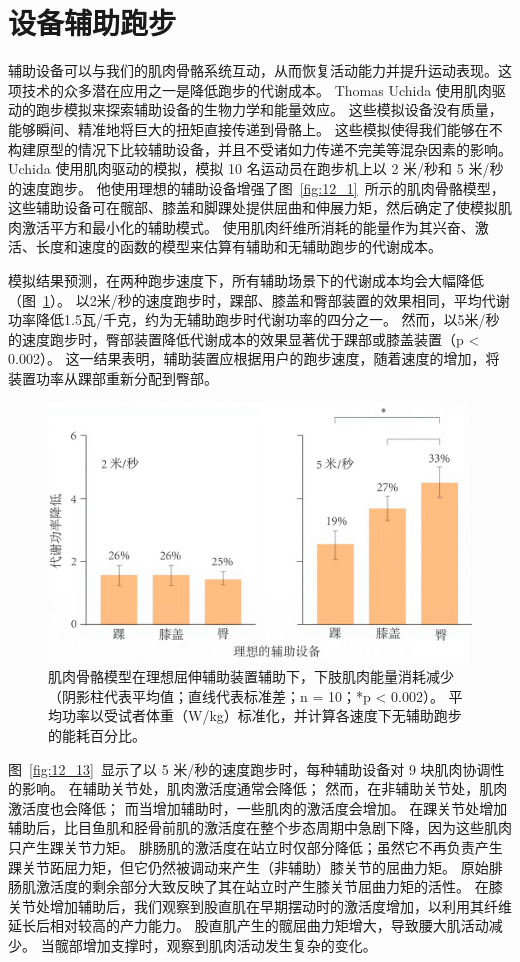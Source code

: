 \section{设备辅助跑步}

辅助设备可以与我们的肌肉骨骼系统互动，从而恢复活动能力并提升运动表现。这项技术的众多潜在应用之一是降低跑步的代谢成本。
Thomas Uchida 使用肌肉驱动的跑步模拟来探索辅助设备的生物力学和能量效应\cite{uchida2016simulating}。
这些模拟设备没有质量，能够瞬间、精准地将巨大的扭矩直接传递到骨骼上。
这些模拟使得我们能够在不构建原型的情况下比较辅助设备，并且不受诸如力传递不完美等混杂因素的影响。
Uchida 使用肌肉驱动的模拟，模拟 10 名运动员在跑步机上以 2 米/秒和 5 米/秒的速度跑步。
他使用理想的辅助设备增强了图~\ref{fig:12_1}~所示的肌肉骨骼模型，这些辅助设备可在髋部、膝盖和脚踝处提供屈曲和伸展力矩，然后确定了使模拟肌肉激活平方和最小化的辅助模式。
使用肌肉纤维所消耗的能量作为其兴奋、激活、长度和速度的函数的模型来估算有辅助和无辅助跑步的代谢成本\cite{umberger2003model,uchida2016simulating}。


模拟结果预测，在两种跑步速度下，所有辅助场景下的代谢成本均会大幅降低（图~\ref{fig:12_12}）。
以2米/秒的速度跑步时，踝部、膝盖和臀部装置的效果相同，平均代谢功率降低1.5瓦/千克，约为无辅助跑步时代谢功率的四分之一。
然而，以5米/秒的速度跑步时，臀部装置降低代谢成本的效果显著优于踝部或膝盖装置（p < 0.002）。
这一结果表明，辅助装置应根据用户的跑步速度，随着速度的增加，将装置功率从踝部重新分配到臀部。

\begin{figure}[!htb]
	\centering
	\includegraphics[width=0.75\linewidth]{chap12/12_12}
	\caption{肌肉骨骼模型在理想屈伸辅助装置辅助下，下肢肌肉能量消耗减少（阴影柱代表平均值；直线代表标准差；n = 10；*p < 0.002）。
		平均功率以受试者体重（W/kg）标准化，并计算各速度下无辅助跑步的能耗百分比\cite{uchida2016simulating}。 \label{fig:12_12}}
\end{figure}


图~\ref{fig:12_13}~显示了以 5 米/秒的速度跑步时，每种辅助设备对 9 块肌肉协调性的影响。
在辅助关节处，肌肉激活度通常会降低；
然而，在非辅助关节处，肌肉激活度也会降低；
而当增加辅助时，一些肌肉的激活度会增加。
在踝关节处增加辅助后，比目鱼肌和胫骨前肌的激活度在整个步态周期中急剧下降，因为这些肌肉只产生踝关节力矩。
腓肠肌的激活度在站立时仅部分降低；虽然它不再负责产生踝关节跖屈力矩，但它仍然被调动来产生（非辅助）膝关节的屈曲力矩。
原始腓肠肌激活度的剩余部分大致反映了其在站立时产生膝关节屈曲力矩的活性。
在膝关节处增加辅助后，我们观察到股直肌在早期摆动时的激活度增加，以利用其纤维延长后相对较高的产力能力。
股直肌产生的髋屈曲力矩增大，导致腰大肌活动减少。
当髋部增加支撑时，观察到肌肉活动发生复杂的变化。


